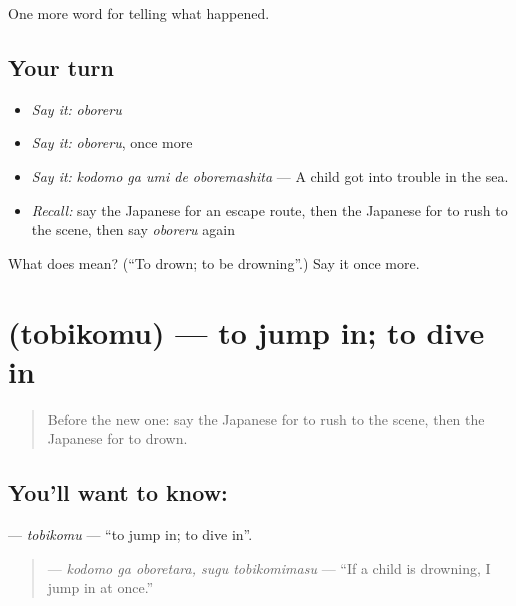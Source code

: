 \begin{grammarlens}[title={What you've built}]
One more word for telling what happened.
\end{grammarlens}

\subsection*{Your turn}
\begin{itemize}
\raggedright
  \item \emph{Say it:} \emph{oboreru}
  \item \emph{Say it:} \emph{oboreru}, once more
  \item \emph{Say it:} \emph{kodomo ga umi de oboremashita} — A child got into trouble in the sea.
  \item \emph{Recall:} say the Japanese for an escape route, then the Japanese for to rush to the scene, then say \emph{oboreru} again
\end{itemize}

\begin{tcolorbox}[breakable,colback=teal!4,colframe=teal!35!black,title={Before you move on}]
What does  mean? (\textquotedblleft{}To drown; to be drowning\textquotedblright{}.) Say it once more.
\end{tcolorbox}
\section[\texorpdfstring{\ja{とびこむ} (tobikomu)}{とびこむ (tobikomu)}]{ (tobikomu) — to jump in; to dive in}

\label{lesson:JA-C266-tobikomu}



\begin{quote}
Before the new one: say the Japanese for to rush to the scene, then the Japanese for to drown.
\end{quote}

\subsection*{You'll want to know: }
\textbf{} — \emph{tobikomu} — \textquotedblleft{}to jump in; to dive in\textquotedblright{}.

\begin{quote}
\textbf{  } — \emph{kodomo ga oboretara, sugu tobikomimasu} — \textquotedblleft{}If a child is drowning, I jump in at once.\textquotedblright{}
\end{quote}

